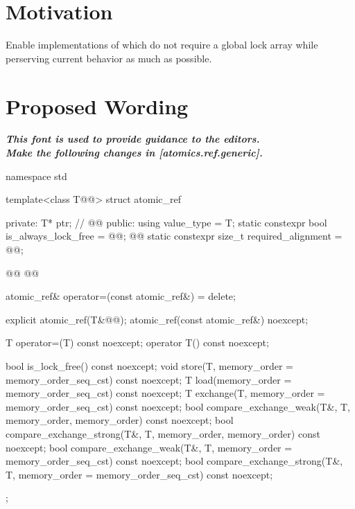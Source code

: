 \section*{Motivation}

Enable implementations of  which do not require a global lock array
while perserving current behavior as much as possible.

\section*{Proposed Wording}

\textbf{\textit{This font is used to provide guidance to the editors.}} \\

\textbf{\textit{Make the following changes in [atomics.ref.generic].}} \\

%
%
\begin{codeblock}
namespace std {
  template<class T@@> struct atomic_ref {
  private:
    T* ptr;      // \expos
    @@
  public:
    using value_type = T;
    static constexpr bool is_always_lock_free = @@;
    @@
    static constexpr size_t required_alignment = @@;

    @@
    @@

    atomic_ref& operator=(const atomic_ref&) = delete;

    explicit atomic_ref(T&@@);
    atomic_ref(const atomic_ref&) noexcept;

    T operator=(T) const noexcept;
    operator T() const noexcept;

    bool is_lock_free() const noexcept;
    void store(T, memory_order = memory_order_seq_cst) const noexcept;
    T load(memory_order = memory_order_seq_cst) const noexcept;
    T exchange(T, memory_order = memory_order_seq_cst) const noexcept;
    bool compare_exchange_weak(T&, T,
                               memory_order, memory_order) const noexcept;
    bool compare_exchange_strong(T&, T,
                                 memory_order, memory_order) const noexcept;
    bool compare_exchange_weak(T&, T,
                               memory_order = memory_order_seq_cst) const noexcept;
    bool compare_exchange_strong(T&, T,
                                 memory_order = memory_order_seq_cst) const noexcept;
  };
}
\end{codeblock}
~\\

